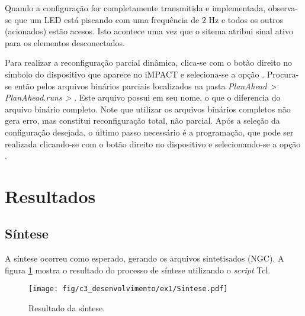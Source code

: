 \documentclass[11pt,a4paper,oneside]{book}
\begin{document}
Quando a configuração for completamente transmitida e implementada, observa-se que um LED está piscando com uma frequência de 2 Hz e todos os outros (acionados) estão acesos.
Isto acontece uma vez que o sitema atribui sinal ativo para os elementos desconectados.

Para realizar a reconfiguração parcial dinâmica, clica-se com o botão direito no símbolo do dispositivo que aparece no iMPACT e seleciona-se a opção .
Procura-se então pelos arquivos binários parciais localizados na pasta \textit{PlanAhead > PlanAhead.runs >} .
Este arquivo possui  em seu nome, o que o diferencia do arquivo binário completo.
Note que utilizar os arquivos binários completos não gera erro, mas constitui reconfiguração total, não parcial.
Após a seleção da configuração desejada, o último passo necessário é a programação, que pode ser realizada clicando-se com o botão direito no dispositivo e selecionando-se a opção .

\section{Resultados}
\subsection{Síntese}
A síntese ocorreu como esperado, gerando os arquivos sintetisados (NGC).
A figura \ref{fig:ex1:sintese} mostra o resultado do processo de síntese utilizando o \textit{script} Tcl.
\begin{figure}[h]
\centering
\texttt{[image: fig/c3\_desenvolvimento/ex1/Sintese.pdf]}
\caption{Resultado da síntese.}
\label{fig:ex1:sintese}
\end{figure}
\end{document}
